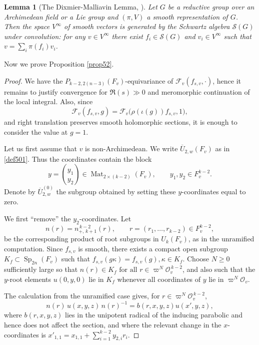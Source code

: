 \documentclass[11pt,notitlepage]{amsart}
\newtheorem{lemma}[theorem]{Lemma}
\theoremstyle{definition}
\theoremstyle{remark}
\newcommand{\calF}{\mathcal{F}}
\newcommand{\calO}{\mathcal{O}}
\newcommand{\nPlusKone}{n_{+,\,k+1}^{\,k-2}}
\DeclareMathOperator{\Sp}{Sp}
\DeclareMathOperator{\Mat}{Mat}
\begin{document}
\begin{lemma}[The Dixmier-Malliavin Lemma, \cite{DM78}]
Let $G$ be a reductive group over an Archimedean field or a Lie group and $(\pi,V)$ a smooth representation of $G$.
Then the space $V^\infty$ of smooth vectors is generated by the Schwartz algebra $\mathcal S(G)$ under convolution: for any $v\in V^\infty$ there exist $f_i\in\mathcal S(G)$ and $v_i\in V^\infty$ such that $v=\sum_i \pi(f_i)v_i$.
\end{lemma}
Now we prove Proposition \ref{prop52}.
\begin{proof}
We have the \(P_{k-2,2(n-3)}(F_v)\)-equivariance of
\(\calF_v(f_{s,v},\cdot)\), hence it remains
to justify convergence for \(\Re(s)\gg0\) and meromorphic continuation of the
local integral. Also, since
\[
\calF_v(f_{s,v},g)
=
\calF_v\bigl(\rho(\iota(g))f_{s,v},1\bigr),\]
and right translation preserves smooth holomorphic sections, it is enough to
consider the value at \(g=1\).

Let us first assume that \(v\) is non-Archimedean. We write
\(\overline U_{2,w}(F_v)\) as in \eqref{def501}. Thus the coordinates contain
the block
\[
  y=\binom{y_1}{y_2}\in \Mat_{2\times(k-2)}(F_v),
  \qquad y_1,y_2\in F_v^{k-2}.
\]
Denote by \(\overline U^{(0)}_{2,w}\) the subgroup obtained by setting these
\(y\)-coordinates equal to zero. 

We first ``remove'' the \(y_2\)-coordinates. Let
\[
  n(r)=\nPlusKone(r),\qquad r=(r_1,\ldots,r_{k-2})\in F_v^{k-2},
\]
be the corresponding product of root subgroups in \(U_k(F_v)\), as in the
unramified computation. Since \(f_{s,v}\) is smooth, there exists a compact open
subgroup \(K_f\subset \Sp_{2n}(F_v)\) such that
  $f_{s,v}(g\kappa)=f_{s,v}(g),\kappa\in K_f$. Choose \(N\geq 0\) sufficiently large so that
  $n(r)\in K_f \text{ for all }r\in \varpi^N\calO_v^{\,k-2}$, and also such that the \(y\)-root elements \(u(0,y,0)\) lie in \(K_f\) whenever
all coordinates of \(y\) lie in \(\varpi^N\calO_v\).

The calculation from the unramified case gives, for
\(r\in \varpi^N\calO_v^{\,k-2}\),
\[
  n(r)\,u(x,y,z)\,n(r)^{-1}=b(r,x,y,z)u(x',y,z),
\]
where \(b(r,x,y,z)\) lies in the unipotent radical of the inducing parabolic and hence
does not affect the section, and where the relevant change in the \(x\)-coordinates
is $x'_{1,1}=x_{1,1}+\sum_{i=1}^{k-2}y_{2,i}r_i$. 


\end{proof}
\end{document}
